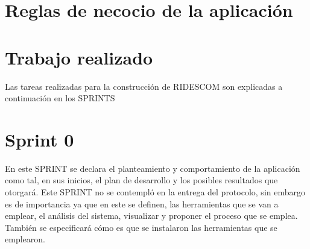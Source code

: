 	
	\section{Reglas de necocio de la aplicación}
	
	\section{Trabajo realizado}
	Las tareas realizadas para la construcción de RIDESCOM son explicadas a continuación en los SPRINTS 
	
	\section{Sprint 0}
	En este SPRINT se declara el planteamiento y comportamiento de la aplicación como tal, en sus inicios, el plan de desarrollo y los posibles resultados que otorgará.
	Este SPRINT no se contempló en la entrega del protocolo, sin embargo es de importancia ya que en este se definen, las herramientas que se van a emplear, el análisis del sistema, visualizar y proponer el proceso que se emplea.
	También se especificará cómo es que se instalaron las herramientas que se emplearon.
	
